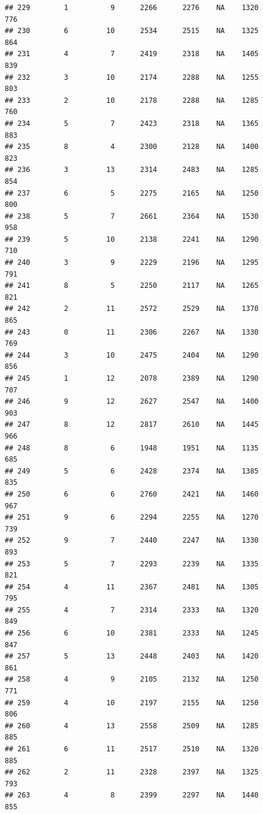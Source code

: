\documentclass[]{book}
\begin{document}
\begin{verbatim}
## 229        1          9      2266      2276    NA    1320            776
## 230        6         10      2534      2515    NA    1325            864
## 231        4          7      2419      2318    NA    1405            839
## 232        3         10      2174      2288    NA    1255            803
## 233        2         10      2178      2288    NA    1285            760
## 234        5          7      2423      2318    NA    1365            883
## 235        8          4      2300      2128    NA    1400            823
## 236        3         13      2314      2483    NA    1285            854
## 237        6          5      2275      2165    NA    1250            800
## 238        5          7      2661      2364    NA    1530            958
## 239        5         10      2138      2241    NA    1290            710
## 240        3          9      2229      2196    NA    1295            791
## 241        8          5      2250      2117    NA    1265            821
## 242        2         11      2572      2529    NA    1370            865
## 243        0         11      2306      2267    NA    1330            769
## 244        3         10      2475      2404    NA    1290            856
## 245        1         12      2078      2389    NA    1290            707
## 246        9         12      2627      2547    NA    1400            903
## 247        8         12      2817      2610    NA    1445            966
## 248        8          6      1948      1951    NA    1135            685
## 249        5          6      2428      2374    NA    1385            835
## 250        6          6      2760      2421    NA    1460            967
## 251        9          6      2294      2255    NA    1270            739
## 252        9          7      2440      2247    NA    1330            893
## 253        5          7      2293      2239    NA    1335            821
## 254        4         11      2367      2481    NA    1305            795
## 255        4          7      2314      2333    NA    1320            849
## 256        6         10      2381      2333    NA    1245            847
## 257        5         13      2448      2403    NA    1420            861
## 258        4          9      2105      2132    NA    1250            771
## 259        4         10      2197      2155    NA    1250            806
## 260        4         13      2558      2509    NA    1285            885
## 261        6         11      2517      2510    NA    1320            885
## 262        2         11      2328      2397    NA    1325            793
## 263        4          8      2399      2297    NA    1440            855

\end{verbatim}
\end{document}
